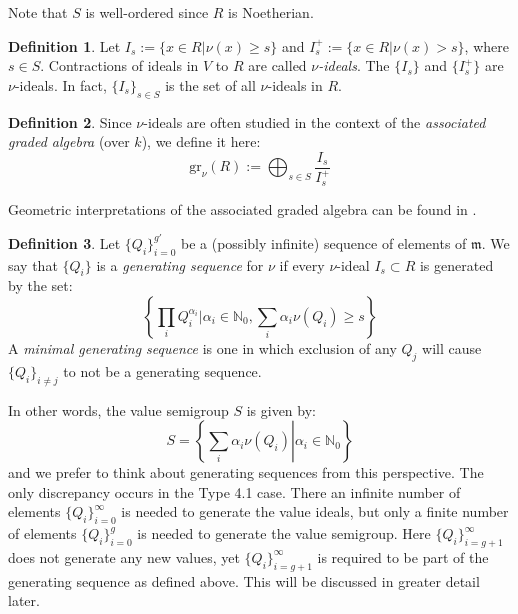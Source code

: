\documentclass[11pt]{amsart}
\theoremstyle{definition}
\newtheorem*{defin}{Definition}
\begin{document}
{Note that $S$ is well-ordered since $R$ is Noetherian.

\begin{defin}
Let $I_s:=\{x\in R \left.|\right. \nu(x)\geq s\}$ and $I_s^+:=\{x\in R \left.|\right. \nu(x)> s\}$, where $s\in S$. Contractions of ideals in $V$ to $R$ are called {\it $\nu$-ideals}. The $\{I_s\}$ and $\{I_s^+\}$ are $\nu$-ideals. In fact, $\displaystyle \{I_s\}_{s\in S}$ is the set of all $\nu$-ideals in $R$.
\end{defin}

\begin{defin}
Since $\nu$-ideals are often studied in the context of the {\it associated graded algebra} (over $k$), we define it here:
\begin{equation*}
\text{gr}_{\nu}(R):=\bigoplus_{s\in S} \frac{I_s}{I_s^+}
\end{equation*}
\end{defin}

Geometric interpretations of the associated graded algebra can be found in \cite{tei}.

\begin{defin}
Let $\{Q_i\}_{i=0}^{g'}$ be a (possibly infinite) sequence of elements of $\mathfrak m$. We say that $\{Q_i\}$ is a {\it generating sequence} for $\nu$ if every $\nu$-ideal $I_s \subset R$ is generated by the set:
\begin{equation*}
\left\{\prod_i Q_i^{\alpha_i} \left.\mid\right. \alpha_i \in \mathbb{N}_0, \sum_i \alpha_i \nu(Q_i) \geq s\right\}
\end{equation*}
A {\it minimal generating sequence} is one in which exclusion of any $Q_j$ will cause $\{Q_i\}_{i\neq j}$ to not be a generating sequence.
\end{defin}

In other words, the value semigroup $S$ is given by:
\begin{equation*}
S=\left\{\sum_{i} \alpha_i \nu(Q_i) \left|\right. \alpha_i \in \mathbb{N}_0\right\}
\end{equation*}
and we prefer to think about generating sequences from this perspective. The only discrepancy occurs in the Type 4.1 case. There an infinite number of elements $\displaystyle \{Q_i\}_{i=0}^{\infty}$ is needed to generate the value ideals, but only a finite number of elements $\displaystyle \{Q_i\}_{i=0}^{g}$ is needed to generate the value semigroup. Here $\{Q_i\}_{i=g+1}^{\infty}$ does not generate any new values, yet $\displaystyle \{Q_i\}_{i=g+1}^{\infty}$ is required to be part of the generating sequence as defined above. This will be discussed in greater detail later.

}
\end{document}
